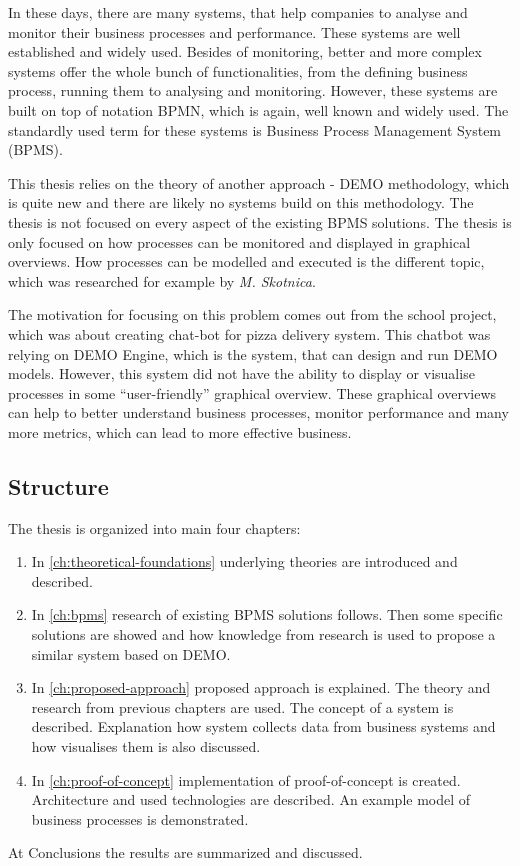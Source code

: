 In these days, there are many systems, that help companies to analyse and monitor their business processes and performance. These systems are well established and widely used. Besides of monitoring, better and more complex systems offer the whole bunch of functionalities, from the defining business process, running them to analysing and monitoring. However, these systems are built on top of notation BPMN, which is again, well known and widely used. The standardly used term for these systems is Business Process Management System (BPMS).

This thesis relies on the theory of another approach - DEMO methodology, which is quite new and there are likely no systems build on this methodology. The thesis is not focused on every aspect of the existing BPMS solutions. The thesis is only focused on how processes can be monitored and displayed in graphical overviews. How processes can be modelled and executed is the different topic, which was researched for example by \textit{M. Skotnica}\cite{diploma-skotnica-2016}. 

The motivation for focusing on this problem comes out from the school project, which was about creating chat-bot for pizza delivery system. This chatbot was relying on DEMO Engine, which is the system, that can design and run DEMO models. However, this system did not have the ability to display or visualise processes in some ``user-friendly'' graphical overview. These graphical overviews can help to better understand business processes, monitor performance and many more metrics, which can lead to more effective business.

\subsection{Structure}
The thesis is organized into main four chapters:
\begin{enumerate}
\item In \cref{ch:theoretical-foundations} underlying theories are introduced and described.
\item In \cref{ch:bpms} research of existing BPMS solutions follows. Then some specific solutions are showed and how knowledge from research is used to propose a similar system based on DEMO.
\item In \cref{ch:proposed-approach} proposed approach is explained. The theory and research from previous chapters are used. The concept of a system is described. Explanation how system collects data from business systems and how visualises them is also discussed.
\item In \cref{ch:proof-of-concept} implementation of proof-of-concept is created. Architecture and used technologies are described. An example model of business processes is demonstrated.
\end{enumerate}

At Conclusions the results are summarized and discussed.



